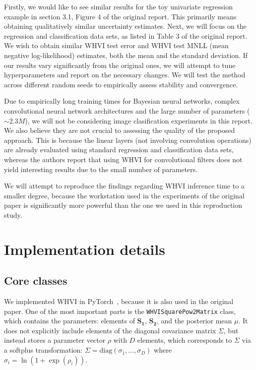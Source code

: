 \documentclass[11pt, twocolumn]{article}
\begin{document}
    Firstly, we would like to see similar results for the toy univariate regression example in section 3.1, Figure 4 of the original report.
    This primarily means obtaining qualitatively similar uncertainty estimates.
    Next, we will focus on the regression and classification data sets, as listed in Table 3 of the original report.
    We wish to obtain similar WHVI test error and WHVI test MNLL (mean negative log-likelihood) estimates, both the mean and the standard deviation.
    If our results vary significantly from the original ones, we will attempt to tune hyperparameters and report on the necessary changes.
    We will test the method across different random seeds to empirically assess stability and convergence.

    Due to empirically long training times for Bayesian neural networks, complex convolutional neural network architectures and the large number of parameters ($\sim 2.3M$), we will not be considering image clasification experiments in this report.
    We also believe they are not crucial to assessing the quality of the proposed approach.
    This is because the linear layers (not involving convolution operations) are already evaluated using standard regression and classification data sets, whereas the authors report that using WHVI for convolutional filters does not yield interesting results due to the small number of parameters.

    We will attempt to reproduce the findings regarding WHVI inference time to a smaller degree, because the workstation used in the experiments of the original paper is significantly more powerful than the one we used in this reproduction study.

    \section{Implementation details}\label{sec:implementation-details}
    \subsection{Core classes}\label{subsec:core-classes}
    We implemented WHVI in PyTorch~\cite{pytorch}, because it is also used in the original paper.
    One of the most important parts is the \texttt{WHVISquarePow2Matrix} class, which contains the parameters: elements of $\mathbf{S_1}$, $\mathbf{S_2}$, and the posterior mean $\mu$.
    It does not explicitly include elements of the diagonal covariance matrix $\Sigma$, but instead stores a parameter vector $\rho$ with $D$ elements, which corresponds to $\Sigma$ via a softplus transformation: $\Sigma = \mathrm{diag}(\sigma_1, \dots, \sigma_D)$ where $\sigma_i = \ln(1 + \exp(\rho_i))$.
\end{document}
